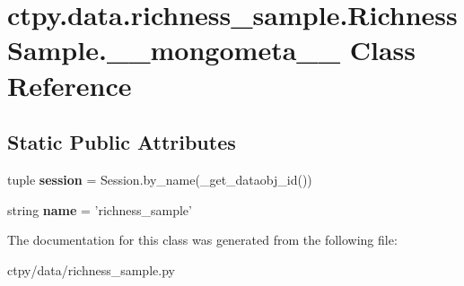 \hypertarget{classctpy_1_1data_1_1richness__sample_1_1_richness_sample_1_1____mongometa____}{\section{ctpy.\-data.\-richness\-\_\-sample.\-Richness\-Sample.\-\_\-\-\_\-mongometa\-\_\-\-\_\- Class Reference}
\label{classctpy_1_1data_1_1richness__sample_1_1_richness_sample_1_1____mongometa____}
}
\subsection*{Static Public Attributes}
\begin{DoxyCompactItemize}
\item 
\hypertarget{classctpy_1_1data_1_1richness__sample_1_1_richness_sample_1_1____mongometa_____a895d0d007a99988a4e0ce1ec982b1673}{tuple {\bfseries session} = Session.\-by\-\_\-name(\-\_\-get\-\_\-dataobj\-\_\-id())}\label{classctpy_1_1data_1_1richness__sample_1_1_richness_sample_1_1____mongometa_____a895d0d007a99988a4e0ce1ec982b1673}

\item 
\hypertarget{classctpy_1_1data_1_1richness__sample_1_1_richness_sample_1_1____mongometa_____a5c60ad30686bb1a71d346dfc86e75481}{string {\bfseries name} = 'richness\-\_\-sample'}\label{classctpy_1_1data_1_1richness__sample_1_1_richness_sample_1_1____mongometa_____a5c60ad30686bb1a71d346dfc86e75481}

\end{DoxyCompactItemize}


The documentation for this class was generated from the following file\-:\begin{DoxyCompactItemize}
\item 
ctpy/data/richness\-\_\-sample.\-py\end{DoxyCompactItemize}
